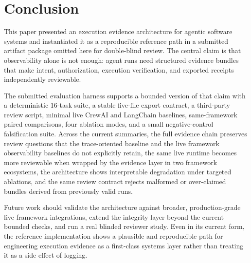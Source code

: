 \section{Conclusion}

This paper presented an execution evidence architecture for agentic software systems and instantiated it as a reproducible reference path in a submitted artifact package omitted here for double-blind review. The central claim is that observability alone is not enough: agent runs need structured evidence bundles that make intent, authorization, execution verification, and exported receipts independently reviewable.

The submitted evaluation harness supports a bounded version of that claim with a deterministic 16-task suite, a stable five-file export contract, a third-party review script, minimal live CrewAI and LangChain baselines, same-framework paired comparisons, four ablation modes, and a small negative-control falsification suite. Across the current summaries, the full evidence chain preserves review questions that the trace-oriented baseline and the live framework observability baselines do not explicitly retain, the same live runtime becomes more reviewable when wrapped by the evidence layer in two framework ecosystems, the architecture shows interpretable degradation under targeted ablations, and the same review contract rejects malformed or over-claimed bundles derived from previously valid runs.

Future work should validate the architecture against broader, production-grade live framework integrations, extend the integrity layer beyond the current bounded checks, and run a real blinded reviewer study. Even in its current form, the reference implementation shows a plausible and reproducible path for engineering execution evidence as a first-class systems layer rather than treating it as a side effect of logging.
